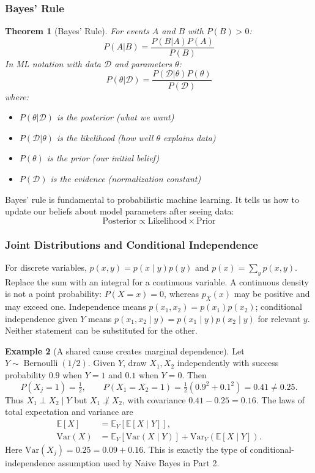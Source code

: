 \documentclass[11pt,twoside]{article}
\numberwithin{equation}{section}
\newcommand{\E}{\mathbb{E}}
\newcommand{\Var}{\mathrm{Var}}
\theoremstyle{plain}
\newtheorem{theorem}{Theorem}[section]
\theoremstyle{definition}
\newtheorem{example}[theorem]{Example}
\theoremstyle{remark}
\newenvironment{keyidea}{
  \begin{tcolorbox}[colback=yellow!5!white,
                    colframe=yellow!50!black,
                    title=Key Idea,
                    breakable,
                    enhanced,
                    sharp corners,
                    boxrule=0.8pt,
                    left=6pt, right=6pt, top=6pt, bottom=6pt]
}{
  \end{tcolorbox}
}
\begin{document}
\subsubsection{Bayes' Rule}

\begin{theorem}[Bayes' Rule]
For events $A$ and $B$ with $P(B) > 0$:
\[
P(A|B) = \frac{P(B|A)P(A)}{P(B)}
\]
In ML notation with data $\mathcal{D}$ and parameters $\theta$:
\[
P(\theta|\mathcal{D}) = \frac{P(\mathcal{D}|\theta)P(\theta)}{P(\mathcal{D})}
\]
where:
\begin{itemize}
\item $P(\theta|\mathcal{D})$ is the \emph{posterior} (what we want)
\item $P(\mathcal{D}|\theta)$ is the \emph{likelihood} (how well $\theta$ explains data)
\item $P(\theta)$ is the \emph{prior} (our initial belief)
\item $P(\mathcal{D})$ is the \emph{evidence} (normalization constant)
\end{itemize}
\end{theorem}

\begin{keyidea}
Bayes' rule is fundamental to probabilistic machine learning. It tells us how to update our beliefs about model parameters after seeing data:
\[
\text{Posterior} \propto \text{Likelihood} \times \text{Prior}
\]
\end{keyidea}

\subsubsection{Joint Distributions and Conditional Independence}
For discrete variables, $p(x,y)=p(x\mid y)p(y)$ and $p(x)=\sum_y p(x,y)$. Replace the sum with an integral for a continuous variable. A continuous density is not a point probability: $P(X=x)=0$, whereas $p_X(x)$ may be positive and may exceed one. Independence means $p(x_1,x_2)=p(x_1)p(x_2)$; conditional independence given $Y$ means $p(x_1,x_2\mid y)=p(x_1\mid y)p(x_2\mid y)$ for relevant $y$. Neither statement can be substituted for the other.

\begin{example}[A shared cause creates marginal dependence]
Let $Y\sim\operatorname{Bernoulli}(1/2)$. Given $Y$, draw $X_1,X_2$ independently with success probability $0.9$ when $Y=1$ and $0.1$ when $Y=0$. Then
\[
P(X_j=1)=\tfrac12,\qquad
P(X_1=X_2=1)=\tfrac12(0.9^2+0.1^2)=0.41\ne0.25.
\]
Thus $X_1\perp X_2\mid Y$ but $X_1\not\perp X_2$, with covariance $0.41-0.25=0.16$. The laws of total expectation and variance are
\begin{align*}
\E[X]&=\E_Y[\E[X\mid Y]],\\
\Var(X)&=\E_Y[\Var(X\mid Y)]+\Var_Y(\E[X\mid Y]).
\end{align*}
Here $\Var(X_j)=0.25=0.09+0.16$. This is exactly the type of conditional-independence assumption used by Naive Bayes in Part 2.
\end{example}
\end{document}
